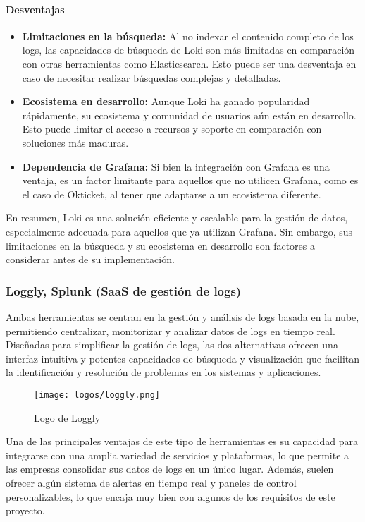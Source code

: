 \newpage{}
\paragraph{Desventajas}
\begin{itemize}
    \item \textbf{Limitaciones en la búsqueda:} Al no indexar el contenido
		completo de los logs, las capacidades de búsqueda de Loki son más
		limitadas en comparación con otras herramientas como Elasticsearch.
		Esto puede ser una desventaja en caso de necesitar realizar búsquedas
		complejas y detalladas.
    \item \textbf{Ecosistema en desarrollo:} Aunque Loki ha ganado popularidad
		rápidamente, su ecosistema y comunidad de usuarios aún están en
		desarrollo. Esto puede limitar el acceso a recursos y soporte en
		comparación con soluciones más maduras.
    \item \textbf{Dependencia de Grafana:} Si bien la integración con Grafana es
		una ventaja, es un factor limitante para aquellos que no utilicen
		Grafana, como es el caso de Okticket, al tener que adaptarse a un
		ecosistema diferente.
\end{itemize}

En resumen, Loki es una solución eficiente y escalable para la gestión de datos,
especialmente adecuada para aquellos que ya utilizan Grafana. Sin embargo, sus
limitaciones en la búsqueda y su ecosistema en desarrollo son factores a
considerar antes de su implementación.


\newpage
\subsubsection{Loggly, Splunk (SaaS de gestión de logs)}
Ambas herramientas se centran en la gestión y análisis de logs basada en la nube,
permitiendo centralizar, monitorizar y analizar datos de logs en tiempo real.
Diseñadas para simplificar la gestión de logs, las dos alternativas ofrecen una
interfaz intuitiva y potentes capacidades de búsqueda y visualización que
facilitan la identificación y resolución de problemas en los sistemas y
aplicaciones.

\begin{figure}[H]
	\centering
	\texttt{[image: logos/loggly.png]}
	\caption{Logo de Loggly~\textregistered}
\end{figure}

Una de las principales ventajas de este tipo de herramientas es su capacidad
para integrarse con una amplia variedad de servicios y plataformas, lo que
permite a las empresas consolidar sus datos de logs en un único lugar. Además,
suelen ofrecer algún sistema de alertas en tiempo real y paneles de control
personalizables, lo que encaja muy bien con algunos de los requisitos de este
proyecto.

